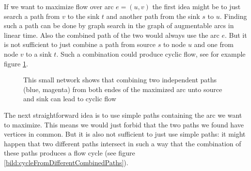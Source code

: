 If we want to maximize flow over arc $e=(u,v)$ the first idea might be to just search a path from $v$ to the sink $t$ 
and another path from the sink $s$ to $u$. Finding such a path can be done by graph search in the graph of augmentable 
arcs in linear time. Also the combined path of the two would always use the arc $e$.
But it is not sufficient to just combine a path from source $s$ to node 
$u$ and one from node $v$ to a sink $t$. Such a combination could produce cyclic flow, see for example figure 
\ref{bild:cycleFromCombinedPaths}. \\

\begin{figure}[h!]
\centering
{}
\caption{This small network shows that combining two independent paths (blue, magenta) from both endes of the maximized 
arc unto source and sink can lead to cyclic flow}
 \label{bild:cycleFromCombinedPaths}
\end{figure}

The next straightforward idea is to use simple paths containing the arc we want to maximize. This means we would just 
forbid that the two paths we found have vertices in common. 
But it is also not sufficient to just use simple paths: it might happen that two different paths intersect in 
such a way that the combination of these paths produces a flow cycle (see figure 
\ref{bild:cycleFromDifferentCombinedPaths}).

